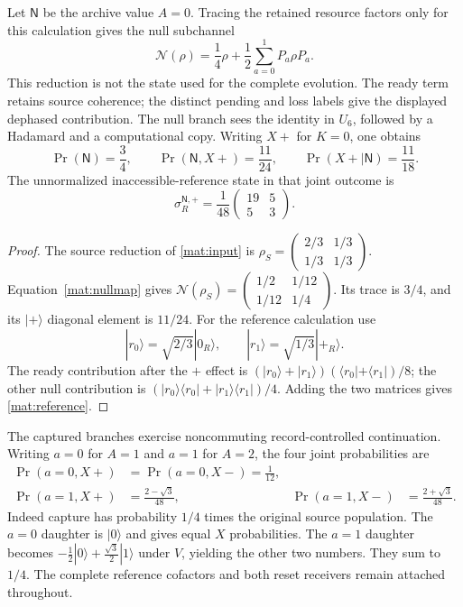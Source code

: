 \documentclass[11pt]{article}
\theoremstyle{definition}\newtheorem{definition}[theorem]{Definition}
\theoremstyle{remark}\newtheorem{remark}[theorem]{Remark}
\begin{document}
Let $\mathsf N$ be the archive value $A=0$.  Tracing the retained resource
factors only for this calculation gives the null subchannel
\begin{equation}\label{mat:nullmap}
 \mathcal N(\rho)=\frac14\rho+
          \frac12\sum_{a=0}^1P_a\rho P_a.
\end{equation}
This reduction is not the state used for the complete evolution.
The ready term retains source coherence; the distinct pending and
loss labels give the displayed dephased contribution.  The null
branch sees the identity in $U_6$, followed by a Hadamard and a
computational copy.  Writing $X+$ for $K=0$, one obtains
\begin{equation}\label{mat:nullnumbers}
 \Pr(\mathsf N)=\frac34,\qquad
 \Pr(\mathsf N,X+)=\frac{11}{24},\qquad
 \Pr(X+\mid\mathsf N)=\frac{11}{18}.
\end{equation}
The unnormalized inaccessible-reference state in that joint outcome is
\begin{equation}\label{mat:reference}
 \sigma_R^{\mathsf N,+}=\frac1{48}
       \begin{pmatrix}19&5\\5&3\end{pmatrix}.
\end{equation}
\begin{proof}
The source reduction of \eqref{mat:input} is
$\rho_S=\left(\begin{smallmatrix}2/3&1/3\\1/3&1/3\end{smallmatrix}\right)$.
Equation~\eqref{mat:nullmap} gives
$\mathcal N(\rho_S)=\left(\begin{smallmatrix}1/2&1/12\\1/12&1/4\end{smallmatrix}\right)$.
Its trace is $3/4$, and its $|+\rangle$ diagonal element is $11/24$.
For the reference calculation use
\[
 |r_0\rangle=\sqrt{2/3}|0_R\rangle,
 \qquad |r_1\rangle=\sqrt{1/3}|+_R\rangle.
\]
The ready contribution after the $+$ effect is
$(|r_0\rangle+|r_1\rangle)(\langle r_0|+\langle r_1|)/8$;
the other null contribution is
$(|r_0\rangle\langle r_0|+|r_1\rangle\langle r_1|)/4$.
Adding the two matrices gives \eqref{mat:reference}.
\end{proof}

The captured branches exercise noncommuting record-controlled
continuation.  Writing $a=0$ for $A=1$ and $a=1$ for $A=2$, the
four joint probabilities are
\begin{align}\label{mat:capturednumbers}
 \Pr(a=0,X+)&=\Pr(a=0,X-)=\frac1{12},\\
 \Pr(a=1,X+)&=\frac{2-\sqrt3}{48},&
 \Pr(a=1,X-)&=\frac{2+\sqrt3}{48}.\nonumber
\end{align}
Indeed capture has probability $1/4$ times the original source
population.  The $a=0$ daughter is $|0\rangle$ and gives equal $X$
probabilities.  The $a=1$ daughter becomes
$-\tfrac12|0\rangle+\tfrac{\sqrt3}{2}|1\rangle$ under $V$, yielding
the other two numbers.  They sum to $1/4$.  The complete reference
cofactors and both reset receivers remain attached throughout.
\end{document}
